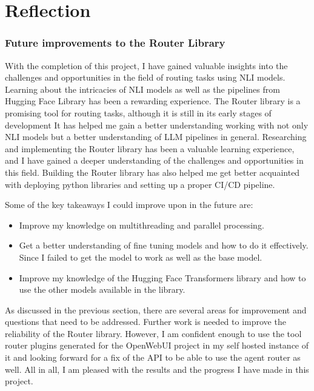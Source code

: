 \chapter{Reflection}
\label{ch:reflection}


\subsection{Future improvements to the Router Library}
\label{sec:results-future-improvements-to-the-router-library}

With the completion of this project, I have gained valuable insights into the challenges and opportunities in the field of routing tasks using NLI models. Learning about the intricacies of NLI models as well as the pipelines from Hugging Face Library has been a rewarding experience. The Router library is a promising tool for routing tasks, although it is still in its early stages of development It has helped me gain a better understanding working with not only NLI models but a better understanding of LLM pipelines in general. Researching and implementing the Router library has been a valuable learning experience, and I have gained a deeper understanding of the challenges and opportunities in this field. Building the Router library has also helped me get better acquainted with deploying python libraries and setting up a proper CI/CD pipeline.

Some of the key takeaways I could improve upon in the future are:
\begin{itemize}
    \item Improve my knowledge on multithreading and parallel processing.
    \item Get a better understanding of fine tuning models and how to do it effectively. Since I failed to get the model to work as well as the base model.
    \item Improve my knowledge of the Hugging Face Transformers library and how to use the other models available in the library.
\end{itemize}


As discussed in the previous section, there are several areas for improvement and questions that need to be addressed. Further  work is needed to improve the reliability of the Router library.
However, I am confident enough to use the tool router plugins generated for the OpenWebUI project in my self hosted instance of it and looking forward for a fix of the API to be able to use the agent router as well. All in all, I am pleased with the results and the progress I have made in this project.

